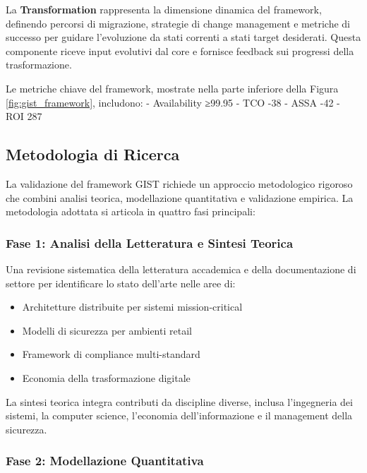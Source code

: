 La \textbf{Transformation} rappresenta la dimensione dinamica del framework, definendo percorsi di migrazione, strategie di change management e metriche di successo per guidare l'evoluzione da stati correnti a stati target desiderati. Questa componente riceve input evolutivi dal core e fornisce feedback sui progressi della trasformazione.

Le metriche chiave del framework, mostrate nella parte inferiore della Figura \ref{fig:gist_framework}, includono:
- Availability ≥99.95%
- TCO -38%
- ASSA -42%
- ROI 287%

\subsection{Metodologia di Ricerca}

La validazione del framework GIST richiede un approccio metodologico rigoroso che combini analisi teorica, modellazione quantitativa e validazione empirica. La metodologia adottata si articola in quattro fasi principali:

\subsubsection{Fase 1: Analisi della Letteratura e Sintesi Teorica}

Una revisione sistematica della letteratura accademica e della documentazione di settore per identificare lo stato dell'arte nelle aree di:
\begin{itemize}
\item Architetture distribuite per sistemi mission-critical
\item Modelli di sicurezza per ambienti retail
\item Framework di compliance multi-standard
\item Economia della trasformazione digitale
\end{itemize}

La sintesi teorica integra contributi da discipline diverse, inclusa l'ingegneria dei sistemi, la computer science, l'economia dell'informazione e il management della sicurezza.

\subsubsection{Fase 2: Modellazione Quantitativa}

